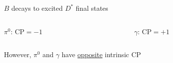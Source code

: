 \documentclass[dvipsnames]{beamer}
\begin{document}
\begin{frame}{$B$ decays to excited $D^*$ final states}
\begin{figure}[H]
\begin{subfigure}{0.45\textwidth}
    \end{subfigure}
  \end{figure}
  \vspace{-0.5cm}
  \begin{columns}
    \begin{column}{0.5\textwidth}
      \begin{center}
        $\pi^0$: CP$ = -1$
      \end{center}
    \end{column}
    \begin{column}{0.5\textwidth}
      \begin{center}
        $\gamma$: CP$ = +1$
      \end{center}
    \end{column}
  \end{columns}
  \vspace{-0.05cm}
  \begin{center}
  {\large However, $\pi^0$ and $\gamma$ have \underline{opposite} intrinsic CP}
  \end{center}
  \vspace{0.56cm}
\end{frame}
\end{document}

